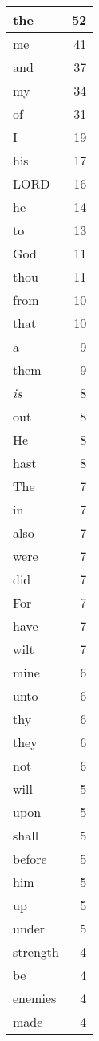 \begin{center}
\begin{longtable}{l|r}
\hline \hline
\endlastfoot
the & 52 \\ \hline
me & 41 \\ \hline
and & 37 \\ \hline
my & 34 \\ \hline
of & 31 \\ \hline
I & 19 \\ \hline
his & 17 \\ \hline
LORD & 16 \\ \hline
he & 14 \\ \hline
to & 13 \\ \hline
God & 11 \\ \hline
thou & 11 \\ \hline
from & 10 \\ \hline
that & 10 \\ \hline
a & 9 \\ \hline
them & 9 \\ \hline
\emph{is} & 8 \\ \hline
out & 8 \\ \hline
He & 8 \\ \hline
hast & 8 \\ \hline
The & 7 \\ \hline
in & 7 \\ \hline
also & 7 \\ \hline
were & 7 \\ \hline
did & 7 \\ \hline
For & 7 \\ \hline
have & 7 \\ \hline
wilt & 7 \\ \hline
mine & 6 \\ \hline
unto & 6 \\ \hline
thy & 6 \\ \hline
they & 6 \\ \hline
not & 6 \\ \hline
will & 5 \\ \hline
upon & 5 \\ \hline
shall & 5 \\ \hline
before & 5 \\ \hline
him & 5 \\ \hline
up & 5 \\ \hline
under & 5 \\ \hline
strength & 4 \\ \hline
be & 4 \\ \hline
enemies & 4 \\ \hline
made & 4 \\ \hline

\end{longtable}
\end{center}
